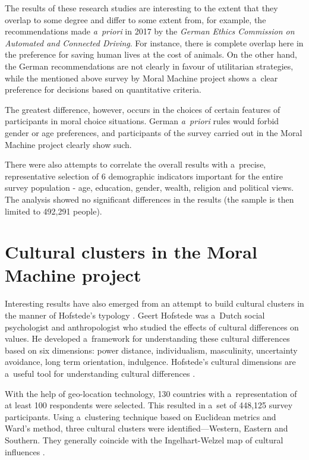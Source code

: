 The results of these research studies are interesting to the extent that they overlap to some degree and differ to some extent from, for example, the recommendations made \textit{a~priori} in 2017 by the \textit{German Ethics Commission on Automated and Connected Driving}. For instance, there is complete overlap here in the preference for saving human lives at the cost of animals. On the other hand, the German recommendations are not clearly in favour of utilitarian strategies, while the mentioned above survey by Moral Machine project shows a~clear preference for decisions based on quantitative criteria.

The greatest difference, however, occurs in the choices of certain features of participants in moral choice situations. German \textit{a~priori} rules would forbid gender or age preferences, and participants of the survey carried out in the Moral Machine project clearly show such.

There were also attempts to correlate the overall results with a~precise, representative selection of 6 demographic indicators important for the entire survey population - age, education, gender, wealth, religion and political views. The analysis showed no significant differences in the results (the sample is then limited to 492,291 people).

\section*{Cultural clusters in the Moral Machine project}
Interesting results have also emerged from an attempt to build cultural clusters in the manner of Hofstede's typology
\parencite[][]{hofstede_cultures_2010}. %
 Geert Hofstede was a~Dutch social psychologist and anthropologist who studied the effects of cultural differences on values. He developed a~framework for understanding these cultural differences based on six dimensions: power distance, individualism, masculinity, uncertainty avoidance, long term orientation, indulgence. Hofstede's cultural dimensions are a~useful tool for understanding cultural differences 
\parencite[][]{hofstede_geert_2011}.%


With the help of geo-location technology, 130 countries with a~representation of at least 100 respondents were selected. This resulted in a~set of 448,125 survey participants. Using a~clustering technique based on Euclidean metrics and Ward's method, three cultural clusters were identified—Western, Eastern and Southern. They generally coincide with the Ingelhart-Welzel map of cultural influences
\parencite[][]{inglehart_modernization_2005}.%


